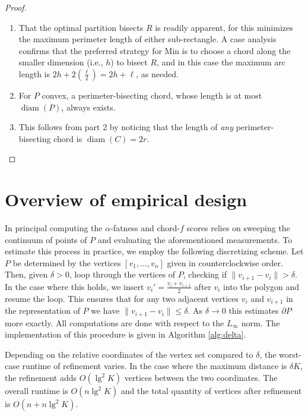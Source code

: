 \documentclass[]{jocg}
\newcommand{\norm}[1]{\|#1\|}
\DeclareMathOperator{\diam}{\mathrm{diam}}
\theoremstyle{definition}
\theoremstyle{remark}
\begin{document}
\begin{proof}
  \begin{enumerate}
    \item That the optimal partition bisects $R$ is readily apparent,
      for this minimizes the maximum perimeter length of either sub-rectangle.
      A case analysis confirms that the preferred strategy for Min is to choose
      a chord along the smaller dimension (i.e., $h$) to bisect $R$, and in this
      case the maximum arc length is $2h + 2\left( \frac{\ell}{2} \right) = 2h +
      \ell$, as needed.
    \item For $P$ convex, a perimeter-bisecting chord, whose length is at most
      $\diam(P)$, always exists. 
    \item This follows from part 2 by noticing that the length of \emph{any}
      perimeter-bisecting chord is $\diam(C) = 2r$. \qedhere
  \end{enumerate}
\end{proof}

\section{Overview of empirical design}

In principal computing the $\alpha$-fatness and chord-$f$ scores relies on sweeping
the continuum of points of $P$ and evaluating the aforementioned measurements.
To estimate this process in practice, we employ the following discretizing
scheme. Let $P$ be determined by the vertices $[v_1, \dots, v_n]$ given in
counterclockwise order. Then, given $\delta > 0$, loop through the vertices of
$P$, checking if $\norm{v_{i+1} - v_i} > \delta$. In the case where this holds,
we insert $v_i' = \frac{v_i + v_{i+1}}{2}$ after $v_i$ into the polygon and
resume the loop. This ensures that for any two adjacent vertices $v_{i}$ and
$v_{i+1}$ in the representation of $P$ we have $\norm{v_{i+1} - v_i} \leq
\delta$. As $\delta \to 0$ this estimates $\partial P$ more exactly. All
computations are done with respect to the $L_{\infty}$ norm. The implementation
of this procedure is given in Algorithm \ref{alg:delta}.

Depending on the relative coordinates of the vertex set compared to $\delta$,
the worst-case runtime of refinement varies. In the case where the maximum
distance is $\delta K$, the refinement adds $O(\lg^2 K)$ vertices between the
two coordinates. The overall runtime is $O(n \lg^2 K)$ and the total quantity of
vertices after refinement is $O(n + n\lg^2 K)$.
\end{document}
